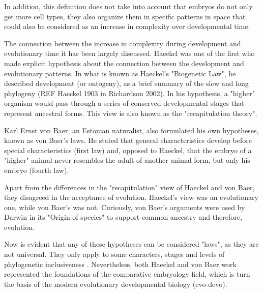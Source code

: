  
In addition, this definition does not take into account that embryos do not only get more cell types, they also organize them in specific patterns in space that could also be considered as an increase in complexity over developmental time.


\begin{mdframed}[style=boxstyle,frametitle={Box1. On the similarity of complexity patterns between Evolution and Development}]\label{Box1:Haeckel&vonBaer}

The connection between the increase in complexity during development and evolutionary time it has been largely discussed.
Haeckel was one of the first who made explicit hypothesis about the connection between the development and evolutionary patterns.
In what is known as Haeckel's "Biogenetic Law", he described development (or ontogeny), as a brief summary of the slow and long phylogeny (REF Haeckel 1903 in Richardson 2002).
In his hypothesis, a "higher" organism would pass through a series of conserved developmental stages that represent ancestral forms. This view is also known as the "recapitulation theory".

Karl Ernst von Baer, an Estonian naturalist, also formulated his own hypotheses, known as von Baer's laws. He stated that general characteristics develop before special characteristics (first law) and, opposed to Haeckel, that the embryo of a "higher" animal never resembles the adult of another animal form, but only his embryo (fourth law). 

Apart from the differences in the "recapitulation" view of Haeckel and von Baer\citep{Richardson2002}, they disagreed in the acceptance of evolution. 
Haeckel's view was an evolutionary one, while von Baer's was not. Curiously, von Baer's arguments were used by Darwin in its "Origin of species" to support common ancestry and therefore, evolution.

Now is evident that any of these hypotheses can be considered "laws", as they are not universal. They only apply to some characters, stages and levels of phylogenetic inclusiveness \citep{Richardson2002}. Nevertheless, both Haeckel and von Baer work represented the foundations of the comparative embryology field, which is turn the basis of the modern evolutionary developmental biology (evo-devo).
\end{mdframed}


